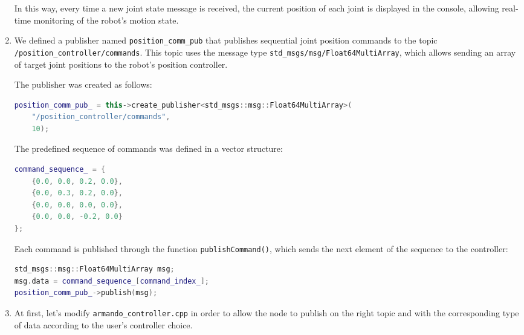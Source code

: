 \documentclass{article}
\begin{document}
\begin{enumerate}
In this way, every time a new joint state message is received, the current position of each joint is displayed in the console, 
allowing real-time monitoring of the robot’s motion state.
\item We defined a publisher named \texttt{position\_comm\_pub} that publishes sequential joint position commands 
to the topic \texttt{/position\_controller/commands}. This topic uses the message type \texttt{std\_msgs/msg/Float64MultiArray}, 
which allows sending an array of target joint positions to the robot’s position controller.

The publisher was created as follows:

\begin{lstlisting}[language=C++]
position_comm_pub_ = this->create_publisher<std_msgs::msg::Float64MultiArray>(
    "/position_controller/commands",
    10);
\end{lstlisting}

The predefined sequence of commands was defined in a vector structure:

\begin{lstlisting}[language=C++]
command_sequence_ = {
    {0.0, 0.0, 0.2, 0.0},
    {0.0, 0.3, 0.2, 0.0},
    {0.0, 0.0, 0.0, 0.0},
    {0.0, 0.0, -0.2, 0.0}
};
\end{lstlisting}

Each command is published through the function \texttt{publishCommand()}, which sends the next element of the sequence to the controller:

\begin{lstlisting}[language=C++]
std_msgs::msg::Float64MultiArray msg;
msg.data = command_sequence_[command_index_];   
position_comm_pub_->publish(msg);
\end{lstlisting}
\item 
At first, let's modify \texttt{armando\_controller.cpp} in order to allow 
the  node to publish on the right topic and 
with the corresponding type of data according to the user's controller choice.


\end{enumerate}
\end{document}
